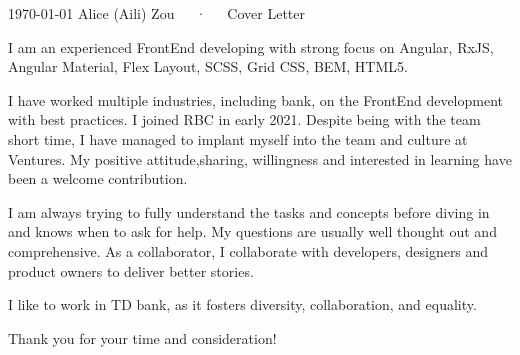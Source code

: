 \documentclass[11pt, a4paper]{awesome-cv}
\begin{document}
\makecvheader[R]

\makecvfooter
  {\today}
  {Alice (Aili) Zou~~~·~~~Cover Letter}
  {}

\makelettertitle

\begin{cvletter}
I am an experienced FrontEnd developing with strong focus on Angular, RxJS, Angular Material, Flex Layout, SCSS, Grid CSS, BEM, HTML5. 

I have worked multiple industries, including bank, on the FrontEnd development with best practices. I joined RBC in early 2021. Despite being with the team short time, I have managed to implant myself into the team and culture at Ventures. My positive attitude,sharing, willingness and interested in learning have been a welcome contribution.

 I am always trying to fully understand the tasks and concepts before diving in and knows when to ask for help. My questions are usually well thought out and comprehensive. As a collaborator, I collaborate with developers, designers and product owners to deliver better stories.
 
 I like to work in TD bank, as it fosters diversity, collaboration, and equality.

Thank you for your time and consideration!
	




\end{cvletter}
\end{document}
